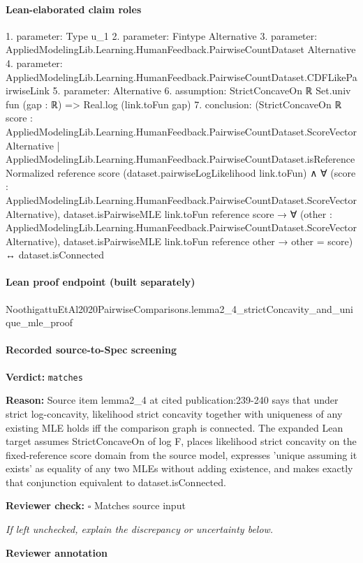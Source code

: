 \documentclass[10pt]{article}
\newcommand{\reviewerbox}{%
  \par\noindent\fbox{\parbox{0.96\linewidth}{\rule{0pt}{0.38in}}}\par
}
\newcommand{\reviewmatch}[1]{%
  \par\noindent\textbf{Reviewer check:} $\square$\; #1\par
  \noindent\emph{If left unchecked, explain the discrepancy or uncertainty below.}\par
}
\begin{document}
\paragraph{Lean-elaborated claim roles}\begin{ReviewVerbatim}
1. parameter: Type u_1
2. parameter: Fintype Alternative
3. parameter: AppliedModelingLib.Learning.HumanFeedback.PairwiseCountDataset Alternative
4. parameter: AppliedModelingLib.Learning.HumanFeedback.PairwiseCountDataset.CDFLikePairwiseLink
5. parameter: Alternative
6. assumption: StrictConcaveOn ℝ Set.univ fun (gap : ℝ) => Real.log (link.toFun gap)
7. conclusion: (StrictConcaveOn ℝ
      {score : AppliedModelingLib.Learning.HumanFeedback.PairwiseCountDataset.ScoreVector Alternative |
        AppliedModelingLib.Learning.HumanFeedback.PairwiseCountDataset.isReferenceNormalized reference score}
      (dataset.pairwiseLogLikelihood link.toFun) ∧
    ∀ (score : AppliedModelingLib.Learning.HumanFeedback.PairwiseCountDataset.ScoreVector Alternative),
      dataset.isPairwiseMLE link.toFun reference score →
        ∀ (other : AppliedModelingLib.Learning.HumanFeedback.PairwiseCountDataset.ScoreVector Alternative),
          dataset.isPairwiseMLE link.toFun reference other → other = score) ↔
  dataset.isConnected
\end{ReviewVerbatim}

\paragraph{Lean proof endpoint (built separately)}\begin{ReviewVerbatim}
NoothigattuEtAl2020PairwiseComparisons.lemma2_4_strictConcavity_and_unique_mle_proof
\end{ReviewVerbatim}

\paragraph{Recorded source-to-Spec screening}
\textbf{Verdict:} \texttt{matches}
\\
{\raggedright
\textbf{Reason:} Source item lemma2\_\allowbreak{}4 at cited publication:\allowbreak{}239-\allowbreak{}240 says that under strict log-\allowbreak{}concavity, likelihood strict concavity together with uniqueness of any existing MLE holds iff the comparison graph is connected.\allowbreak{} The expanded Lean target assumes StrictConcaveOn of log F, places likelihood strict concavity on the fixed-\allowbreak{}reference score domain from the source model, expresses 'unique assuming it exists' as equality of any two MLEs without adding existence, and makes exactly that conjunction equivalent to dataset.\allowbreak{}isConnected.\allowbreak{}
\par}
\reviewmatch{Matches source input}
\noindent\textbf{Reviewer annotation}\par
\reviewerbox
\clearpage
\hypertarget{source-claim-c8913dc4eae41fb3}{}
\end{document}
